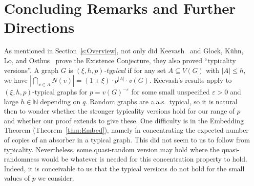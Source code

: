 \documentclass[11pt]{article}
\numberwithin{equation}{section}
\newcounter{i}
\theoremstyle{plain}
\theoremstyle{plain} %
\theoremstyle{definition}
\newcommand{\aas}{a.a.s.\ }
\begin{document}




\section{Concluding Remarks and Further Directions}\label{s:Conclusion}

As mentioned in Section~\ref{s:Overview}, not only did Keevash~\cite{K14} and Glock, K\"uhn, Lo, and Osthus~\cite{GKLO16} prove the Existence Conjecture, they also proved ``typicality versions''.  A graph $G$ is \textit{$(\xi, h, p)$-typical} if for any set $A \subseteq V(G)$ with $|A| \leq h$, we have $|\bigcap_{v\in A} N(v)| = (1 \pm \xi)\cdot p^{|A|}\cdot v(G)$.  Keevash's results apply to $(\xi, h, p)$-typical graphs for $p = v(G)^{-\varepsilon}$ for some small unspecified $\varepsilon > 0$ and large $h \in \mathbb N$ depending on $q$. Random graphs are \aas typical, so it is natural then to wonder whether the stronger typicality versions hold for our range of $p$ and whether our proof extends to give these. One difficulty is in the Embedding Theorem (Theorem~\ref{thm:Embed}), namely in concentrating the expected number of copies of an absorber in a typical graph. This did not seem to us to follow from typicality. Nevertheless, some quasi-random version may hold where the quasi-randomness would be whatever is needed for this concentration property to hold. Indeed, it is conceivable to us that the typical versions do not hold for the small values of $p$ we consider.
\end{document}
